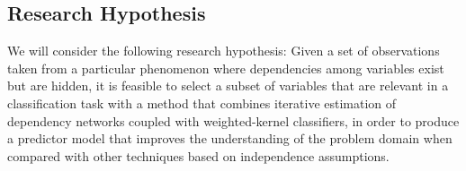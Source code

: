 \subsection{Research Hypothesis} 

We will consider the following research hypothesis: Given a set of observations taken from a particular phenomenon where dependencies among variables exist but are hidden, it is feasible to select a subset of variables that are relevant in a classification task with a method that combines iterative estimation of dependency networks coupled with weighted-kernel classifiers, in order to produce a predictor model that improves the understanding of the problem domain when compared with other techniques based on independence assumptions.
